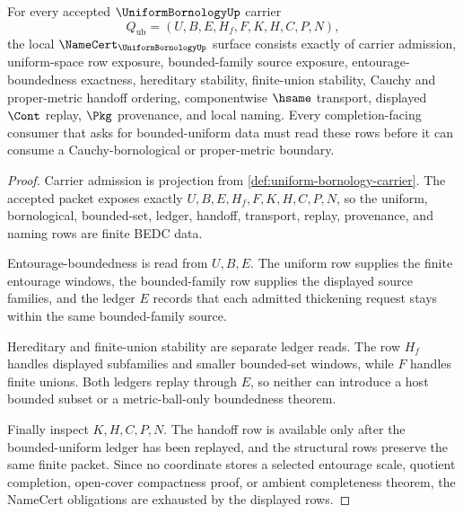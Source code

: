 \begin{theorem}
\label{thm:uniform-bornology-namecert-obligations}
For every accepted $\UniformBornologyUp$ carrier
$$
Q_{\mathrm{ub}}=(U,B,E,H_f,F,K,H,C,P,N),
$$
the local $\NameCert_{\UniformBornologyUp}$ surface consists exactly of carrier admission, uniform-space row exposure, bounded-family source exposure, entourage-boundedness exactness, hereditary stability, finite-union stability, Cauchy and proper-metric handoff ordering, componentwise $\hsame$ transport, displayed $\Cont$ replay, $\Pkg$ provenance, and local naming. Every completion-facing consumer that asks for bounded-uniform data must read these rows before it can consume a Cauchy-bornological or proper-metric boundary.
\end{theorem}
\begin{proof}
Carrier admission is projection from \autoref{def:uniform-bornology-carrier}. The accepted packet exposes exactly $U,B,E,H_f,F,K,H,C,P,N$, so the uniform, bornological, bounded-set, ledger, handoff, transport, replay, provenance, and naming rows are finite BEDC data.

Entourage-boundedness is read from $U,B,E$. The uniform row supplies the finite entourage windows, the bounded-family row supplies the displayed source families, and the ledger $E$ records that each admitted thickening request stays within the same bounded-family source.

Hereditary and finite-union stability are separate ledger reads. The row $H_f$ handles displayed subfamilies and smaller bounded-set windows, while $F$ handles finite unions. Both ledgers replay through $E$, so neither can introduce a host bounded subset or a metric-ball-only boundedness theorem.

Finally inspect $K,H,C,P,N$. The handoff row is available only after the bounded-uniform ledger has been replayed, and the structural rows preserve the same finite packet. Since no coordinate stores a selected entourage scale, quotient completion, open-cover compactness proof, or ambient completeness theorem, the NameCert obligations are exhausted by the displayed rows.
\end{proof}

